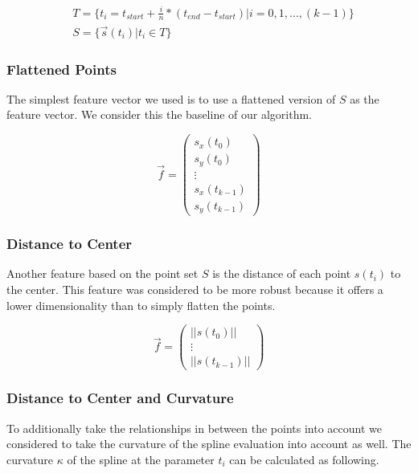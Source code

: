 \documentclass[pdftex,12pt,a4paper]{report}
\begin{document}
\begin{equation}
\begin{split}
& T = \{ t_i=t_{start} + \frac{i}{n} * (t_{end}-t_{start}) | i=0, 1, \dots, (k-1) \} \\
& S = \{ \vec{s}(t_i) | t_i \in T \}
\end{split}
\end{equation}  

\subsubsection{Flattened Points}
\label{subsub:features-flattened}

The simplest feature vector we used is to use a flattened version of $S$ as the feature
vector. We consider this the baseline of our algorithm.

\begin{equation}
\vec{f} = \left( \begin{array}{c}
s_x(t_0) \\
s_y(t_0) \\
\vdots \\
s_x(t_{k-1}) \\
s_y(t_{k-1})
\end{array} \right)
\end{equation}

\subsubsection{Distance to Center}

Another feature based on the point set $S$ is the distance of each point $s(t_i)$ to the
center. This feature was considered	to be more robust because it offers a lower dimensionality
than to simply flatten the points.

\begin{equation}
\vec{f} = \left( \begin{array}{c}
||s(t_0)|| \\
\vdots \\
||s(t_{k-1})||
\end{array} \right)
\end{equation}

\subsubsection{Distance to Center and Curvature}
\label{subsub:featuredistancetocenterandcurvature}

To additionally take the relationships in between the points into account we considered
to take the curvature of the spline evaluation into account as well. The curvature $\kappa$ of the spline at the parameter $t_i$ can be calculated as following.
\end{document}
